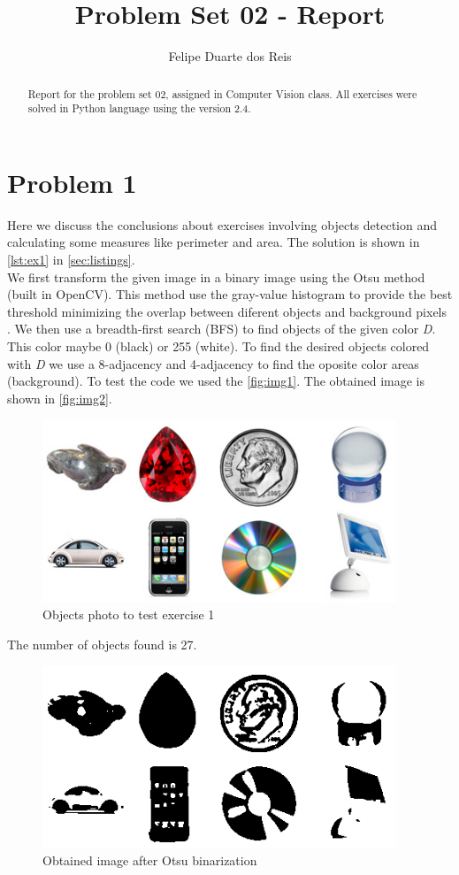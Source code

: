 \documentclass[a4paper,10pt]{article}
\title{Problem Set 02 - Report}
\author{Felipe Duarte dos Reis}
\begin{document}
\maketitle

\begin{abstract}
Report for the problem set 02, assigned in Computer Vision class. All exercises were solved in Python language using the
version 2.4.
\end{abstract}

\section{Problem 1}
Here we discuss the conclusions about exercises involving objects detection and calculating some measures like perimeter and area. 
The solution is shown in \autoref{lst:ex1} in \autoref{sec:listings}. \\
We first transform the given image in a binary image using the Otsu method (built in OpenCV). 
This method use the gray-value histogram to provide the best threshold minimizing the overlap between diferent objects and background pixels 
\cite[p. 170]{Klette:Concise_Computer_Vision}.
We then use a breadth-first search (BFS) to find objects of the given color \textit{D}. This color maybe 0 (black) or 255 (white).
To find the desired objects colored with \textit{D} we use a 8-adjacency and 4-adjacency to find the oposite color areas (background).
To test the code we used the \autoref{fig:img1}. The obtained image is shown in \autoref{fig:img2}.
\begin{figure}[H]
  \centering
  \includegraphics[width=400px]{../images/objects}
  \caption{Objects photo to test exercise 1}
  \label{fig:img1}
\end{figure}

The number of objects found is 27.

\begin{figure}[H]
  \centering
  \includegraphics[width=400px]{../results/binary}
  \caption{Obtained image after Otsu binarization}
  \label{fig:img2}
\end{figure}
\end{document}
